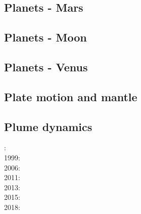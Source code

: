 \noindent
\cite{hack90}
\cite{hack91}
\cite{agzf14}

\subsection*{Planets - Mars}

\cite{scbg90}
\cite{nist01}
\cite{vavv05}
\cite{seki14}
\cite{zhon16}

\subsection*{Planets - Moon}

\cite{zhdv19}

\subsection*{Planets - Venus}

\cite{scbg90}
\cite{kiha92}
\cite{somo96}
\cite{mazk98}\cite{moso98}
\cite{vavv05}
\cite{arta12}
\cite{cram17}\cite{dast17}
\cite{king18}



\subsection*{Plate motion and mantle}

\noindent
\cite{zieg92a}
\cite{zhgm98}
\cite{lizh09}
\cite{huss12}
\cite{mosq13}
\cite{yoha15}
\cite{tewg19}

\subsection*{Plume dynamics}

: \cite{nasf94}\cite{hayu94}\\
1999: \cite{lays99}\\
2006: \cite{isst06}\\
2011: \cite{toyu11}\cite{talz11}\cite{burk11}\cite{memm11}\\
2013: \cite{dagm13}\cite{madd13}\\
2015: \cite{daso15}\cite{hafg15}\\
2018: \cite{dacc18}

